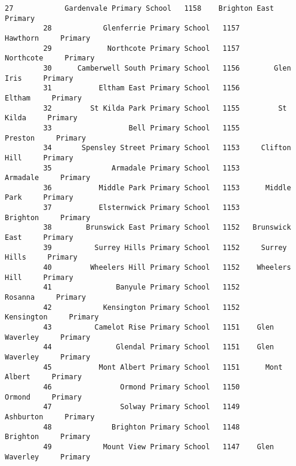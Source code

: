 \documentclass[11pt]{article}
\begin{document}
\begin{Verbatim}[commandchars=\\\{\}]
         27            Gardenvale Primary School   1158    Brighton East     Primary   
         28            Glenferrie Primary School   1157         Hawthorn     Primary   
         29             Northcote Primary School   1157        Northcote     Primary   
         30      Camberwell South Primary School   1156        Glen Iris     Primary   
         31           Eltham East Primary School   1156           Eltham     Primary   
         32         St Kilda Park Primary School   1155         St Kilda     Primary   
         33                  Bell Primary School   1155          Preston     Primary   
         34       Spensley Street Primary School   1153     Clifton Hill     Primary   
         35              Armadale Primary School   1153         Armadale     Primary   
         36           Middle Park Primary School   1153      Middle Park     Primary   
         37           Elsternwick Primary School   1153         Brighton     Primary   
         38        Brunswick East Primary School   1152   Brunswick East     Primary   
         39          Surrey Hills Primary School   1152     Surrey Hills     Primary   
         40         Wheelers Hill Primary School   1152    Wheelers Hill     Primary   
         41               Banyule Primary School   1152          Rosanna     Primary   
         42            Kensington Primary School   1152       Kensington     Primary   
         43          Camelot Rise Primary School   1151    Glen Waverley     Primary   
         44               Glendal Primary School   1151    Glen Waverley     Primary   
         45           Mont Albert Primary School   1151      Mont Albert     Primary   
         46                Ormond Primary School   1150           Ormond     Primary   
         47                Solway Primary School   1149        Ashburton     Primary   
         48              Brighton Primary School   1148         Brighton     Primary   
         49            Mount View Primary School   1147    Glen Waverley     Primary   
         

\end{Verbatim}
\end{document}
